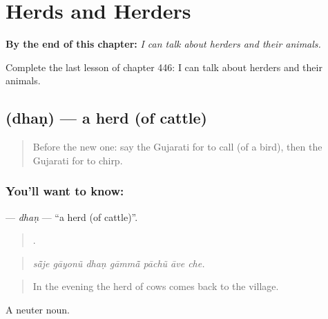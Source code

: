 
\chapter{Herds and Herders}
\label{ch:gu-herds-and-herders}

\begin{chapteropening}
\textbf{By the end of this chapter:} \emph{I can talk about herders and their animals.}

Complete the last lesson of chapter 446: I can talk about herders and their animals.
\end{chapteropening}

\section[\texorpdfstring{\gu{ધણ} (dhaṇ)}{ધણ (dhaṇ)}]{ (dhaṇ) — a herd (of cattle)}

\label{lesson:GU-C446-dhan}



\begin{quote}
Before the new one: say the Gujarati for to call (of a bird), then the Gujarati for to chirp.
\end{quote}

\subsection*{You'll want to know: }
\textbf{} — \emph{dhaṇ} — \textquotedblleft{}a herd (of cattle)\textquotedblright{}.

\begin{quote}
      .
\end{quote}

\begin{quote}
\emph{sā̃je gāyonũ dhaṇ gāmmā̃ pāchũ āve che.}
\end{quote}

\begin{quote}
In the evening the herd of cows comes back to the village.
\end{quote}

A neuter noun.

